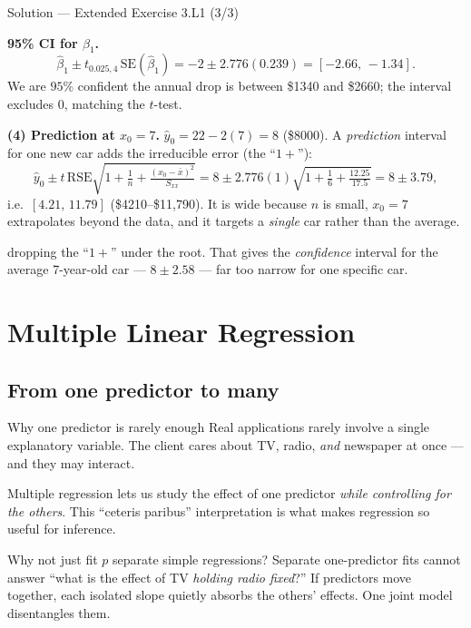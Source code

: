 \documentclass[aspectratio=169,11pt]{beamer}
\begin{document}
\begin{frame}{Solution --- Extended Exercise 3.L1 (3/3)}
  \begin{solutionbox}
    \textbf{95\% CI for $\beta_1$.}
    \[
      \hat\beta_1\pm t_{0.025,4}\,\mathrm{SE}(\hat\beta_1)
      =-2\pm 2.776(0.239)=[-2.66,\,-1.34].
    \]
    We are $95\%$ confident the annual drop is between \$1340 and \$2660;
    the interval excludes $0$, matching the $t$-test.

    \textbf{(4) Prediction at $x_0=7$.} $\hat y_0=22-2(7)=8$
    (\$8000). A \emph{prediction} interval for one new car adds the
    irreducible error (the ``$1+$''):
    \[
      \hat y_0\pm t\,\mathrm{RSE}\sqrt{1+\tfrac1n+\tfrac{(x_0-\bar x)^2}{S_{xx}}}
      =8\pm 2.776(1)\sqrt{1+\tfrac16+\tfrac{12.25}{17.5}}=8\pm 3.79,
    \]
    i.e.\ $[4.21,\,11.79]$ (\$4210--\$11{,}790). It is wide because $n$ is
    small, $x_0=7$ extrapolates beyond the data, and it targets a
    \emph{single} car rather than the average.
  \end{solutionbox}
  \begin{mistake}
    dropping the ``$1+$'' under the root. That
    gives the \emph{confidence} interval for the average 7-year-old car ---
    $8 \pm 2.58$ --- far too narrow for one specific car.
  \end{mistake}
\end{frame}





\section{Multiple Linear Regression}
\subsection{From one predictor to many}

\begin{frame}{Why one predictor is rarely enough}
  Real applications rarely involve a single explanatory variable. The
  client cares about TV, radio, \emph{and} newspaper at once --- and
  they may interact.
  \begin{takeaway}
    Multiple regression lets us study the effect of one predictor
    \emph{while controlling for the others}. This ``ceteris paribus''
    interpretation is what makes regression so useful for inference.
  \end{takeaway}
  \begin{alertblock}{Why not just fit $p$ separate simple regressions?}
    Separate one-predictor fits cannot answer ``what is the effect of TV
    \emph{holding radio fixed}?'' If predictors move together, each
    isolated slope quietly absorbs the others' effects. One joint model
    disentangles them.
  \end{alertblock}
\end{frame}
\end{document}
